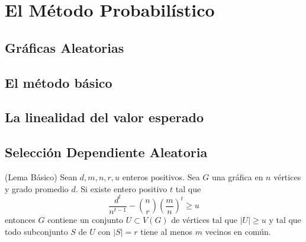 

\chapter{El Método Probabilístico}

\section{Gráficas Aleatorias}

\section{El método básico}

\section{La linealidad del valor esperado}

\section{Selección Dependiente Aleatoria}

\begin{theorem}(Lema Básico)\label{drc}
  Sean $d, m, n, r, u$ enteros positivos. Sea $G$ una gráfica en
  $n$ vértices y grado promedio $d$. Si existe
  entero positivo $t$
  tal que
  $$\frac{d^t}{n^{t-1}} - \binom{n}{r} \left(\frac{m}{n}\right)^t \geq u$$
  entonces $G$ contiene un conjunto $U \subset V(G)$ de vértices tal que
  $\vert U \vert \geq u$ y tal que todo subconjunto $S$ de $U$ con
  $\vert S \vert = r$
  tiene al menos $m$ vecinos en común.
\end{theorem}

